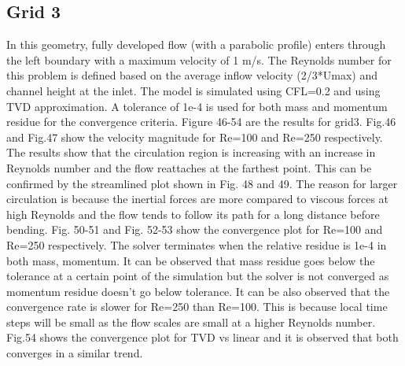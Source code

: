 \documentclass[12pt]{elsarticle}
\begin{document}
	\subsection{Grid 3}
	In this geometry, fully developed flow (with a parabolic profile) enters through the left boundary with a maximum velocity of 1 m/s. The Reynolds number for this problem is defined based on the average inflow velocity (2/3*Umax) and channel height at the inlet. The model is simulated using CFL=0.2 and using TVD approximation. A tolerance of 1e-4 is used for both mass and momentum residue for the convergence criteria. Figure 46-54 are the results for grid3. Fig.46 and Fig.47 show the velocity magnitude for Re=100 and Re=250 respectively. The results show that the circulation region is increasing with an increase in Reynolds number and the flow reattaches at the farthest point. This can be confirmed by the streamlined plot shown in Fig. 48 and 49. The reason for larger circulation is because the inertial forces are more compared to viscous forces at high Reynolds and the flow tends to follow its path for a long distance before bending.\newline
	\newline
	Fig. 50-51 and Fig. 52-53 show the convergence plot for Re=100 and Re=250 respectively. The solver terminates when the relative residue is 1e-4 in both mass, momentum. It can be observed that mass residue goes below the tolerance at a certain point of the simulation but the solver is not converged as momentum residue doesn’t go below tolerance. It can be also observed that the convergence rate is slower for Re=250 than Re=100. This is because local time steps will be small as the flow scales are small at a higher Reynolds number. Fig.54 shows the convergence plot for TVD vs linear and it is observed that both converges in a similar trend.
	
\end{document}
